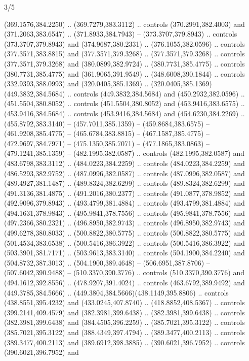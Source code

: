 \begin{flagdescription}{3/5}
\begin{scope}[shift={(0.5\flaglength,0.5\flagwidth)},scale=\flagwidth/510]
\begin{scope}[y=0.80pt, x=0.80pt, yscale=-1.06, xscale=1.06,yshift=-240pt,xshift=-400pt]
\begin{scope}[cm={{0.83333,0.0,0.0,0.83333,(154.64672,48.64761)}}]
  (369.1576,384.2250) .. (369.7279,383.3112) .. controls (370.2991,382.4003) and
  (371.2063,383.6547) .. (371.8933,384.7943) -- (373.3707,379.8943) .. controls
  (373.3707,379.8943) and (374.9687,380.2331) .. (376.1055,382.0596) .. controls
  (377.3571,383.8815) and (377.3571,379.3268) .. (377.3571,379.3268) .. controls
  (377.3571,379.3268) and (380.0899,382.9724) .. (380.7731,385.4775) .. controls
  (380.7731,385.4775) and (361.9065,391.9549) .. (348.6008,390.1844) .. controls
  (332.9393,388.0993) and (320.0405,385.1369) ..
  (320.0405,385.1369)(449.3832,384.5684) .. controls (449.3832,384.5684) and
  (450.2932,382.0596) .. (451.5504,380.8052) .. controls (451.5504,380.8052) and
  (453.9416,383.6575) .. (453.9416,384.5684) .. controls (453.9416,384.5684) and
  (454.6230,384.2269) .. (455.8792,383.3140) -- (457.7011,385.1359) --
  (459.8684,383.6575) -- (461.9208,385.4775) -- (465.6784,383.8815) --
  (467.1587,385.4775) -- (472.9697,384.7971) -- (475.1350,385.7071) --
  (477.1865,383.0863) -- (479.1241,385.1359) -- (482.1995,382.0587) .. controls
  (482.1995,382.0587) and (483.6798,383.3112) .. (484.0223,384.2259) .. controls
  (484.0223,384.2259) and (486.5293,382.9752) .. (487.0996,382.0587) .. controls
  (487.0996,382.0587) and (489.4927,381.1487) .. (489.8324,382.6299) .. controls
  (489.8324,382.6299) and (491.3136,381.4875) .. (491.2016,380.2377) .. controls
  (491.0877,378.9852) and (492.9096,379.8943) .. (493.4799,381.4884) .. controls
  (493.4799,381.4884) and (494.1631,378.9843) .. (495.9841,378.7556) .. controls
  (495.9841,378.7556) and (497.2366,380.2321) .. (496.8950,382.9743) .. controls
  (496.8950,382.9743) and (499.6278,380.8033) .. (500.8822,380.5775) .. controls
  (500.8822,380.5775) and (501.4534,383.6538) .. (500.5416,386.3922) .. controls
  (500.5416,386.3922) and (503.3901,381.7171) .. (503.9613,383.3140) .. controls
  (504.1900,384.2240) and (504.8732,387.3013) .. (504.1900,389.4648) --
  (506.6951,387.8706) -- (507.6042,390.9488) -- (510.3370,390.3776) .. controls
  (510.3370,390.3776) and (494.1612,392.8556) .. (478.9207,391.4024) .. controls
  (463.6792,389.9492) and (449.3785,384.5666) ..
  (449.3804,384.5666)(438.1149,395.8806) .. controls (438.8551,395.4232) and
  (433.0245,407.8740) .. (418.8852,408.5367) .. controls (399.2141,409.4579) and
  (382.3981,399.6438) .. (382.3981,399.6438) .. controls (382.3981,399.6438) and
  (384.4505,396.2259) .. (385.7021,395.3122) .. controls (385.7021,395.3122) and
  (388.4349,397.4794) .. (389.3477,400.2113) .. controls (389.3477,400.2113) and
  (389.6912,398.3885) .. (390.6021,396.7952) .. controls (390.6021,396.7952) and

\end{scope}
\end{scope}
\end{scope}
\end{flagdescription}
